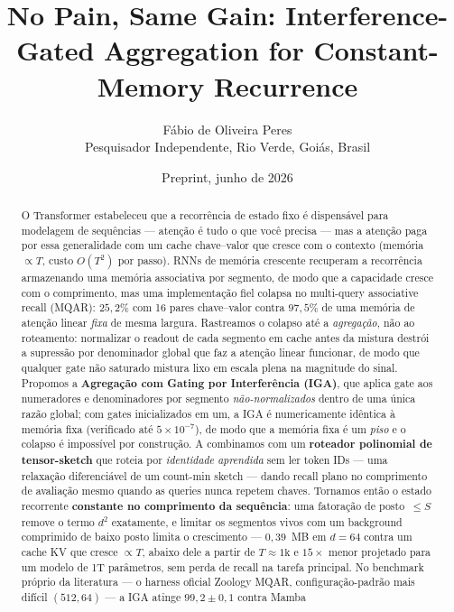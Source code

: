 \documentclass[11pt]{article}
\title{No Pain, Same Gain: Interference-Gated Aggregation for
       Constant-Memory Recurrence}
\author{F\'abio de Oliveira Peres\\
        \small Pesquisador Independente, Rio Verde, Goi\'as, Brasil}
\date{Preprint, junho de 2026}
\begin{document}
\maketitle

\begin{abstract}
O Transformer estabeleceu que a recorr\^encia de estado fixo \'e dispens\'avel
para modelagem de sequ\^encias --- aten\c{c}\~ao \'e tudo o que voc\^e precisa ---
mas a aten\c{c}\~ao paga por essa generalidade com um cache
chave--valor que cresce com o contexto (mem\'oria $\propto T$, custo $O(T^2)$ por
passo). RNNs de mem\'oria crescente \citep{behrouz2026memorycaching} recuperam a
recorr\^encia armazenando uma mem\'oria associativa por segmento, de modo que a
capacidade cresce com o comprimento, mas uma implementa\c{c}\~ao fiel colapsa no
multi-query associative recall (MQAR): $25{,}2\%$ com 16 pares chave--valor
contra $97{,}5\%$ de uma mem\'oria de aten\c{c}\~ao linear \emph{fixa} de mesma
largura. Rastreamos o colapso at\'e a \emph{agrega\c{c}\~ao}, n\~ao ao
roteamento: normalizar o readout de cada segmento em cache antes da mistura
destr\'oi a supress\~ao por denominador global que faz a aten\c{c}\~ao linear
funcionar, de modo que qualquer gate n\~ao saturado mistura lixo em escala plena
na magnitude do sinal. Propomos a \textbf{Agrega\c{c}\~ao com Gating por
Interfer\^encia (IGA)}, que aplica gate aos numeradores e denominadores por
segmento \emph{n\~ao-normalizados} dentro de uma \'unica raz\~ao global; com
gates inicializados em um, a IGA \'e numericamente id\^entica \`a mem\'oria fixa
(verificado at\'e $5\times10^{-7}$), de modo que a mem\'oria fixa \'e um
\emph{piso} e o colapso \'e imposs\'ivel por constru\c{c}\~ao. A combinamos com um
\textbf{roteador polinomial de tensor-sketch} que roteia por \emph{identidade
aprendida} sem ler token IDs --- uma relaxa\c{c}\~ao diferenci\'avel de um
count-min sketch --- dando recall plano no comprimento de avalia\c{c}\~ao mesmo
quando as queries nunca repetem chaves. Tornamos ent\~ao o estado recorrente
\textbf{constante no comprimento da sequ\^encia}: uma fatora\c{c}\~ao de
posto~$\le S$ remove o termo $d^2$ exatamente, e limitar os segmentos vivos com um
background comprimido de baixo posto limita o crescimento --- $0{,}39$~MB em
$d=64$ contra um cache KV que cresce $\propto T$, abaixo dele a partir de
$T\!\approx\!1\mathrm{k}$ e $15\times$ menor projetado para um modelo de 1T
par\^ametros, sem perda de recall na tarefa principal. No benchmark pr\'oprio da
literatura --- o harness oficial Zoology MQAR, configura\c{c}\~ao-padr\~ao mais
dif\'icil $(512,64)$ --- a IGA atinge $99{,}2\pm0{,}1$ contra Mamba

\end{abstract}
\end{document}
